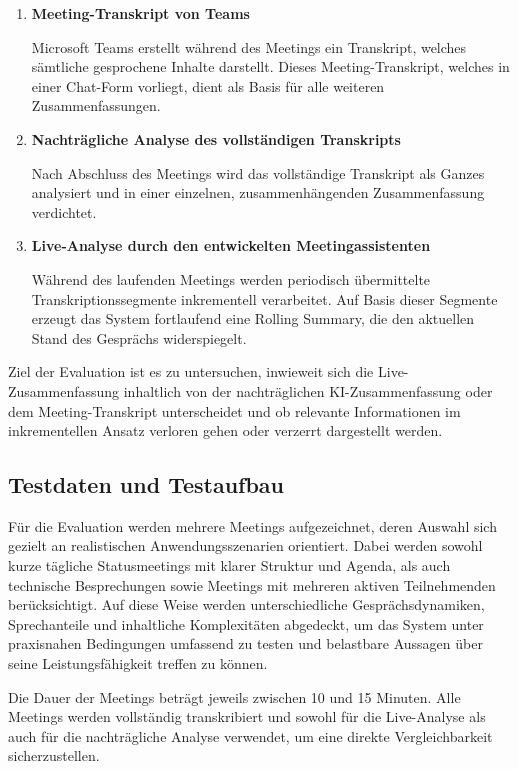 \begin{enumerate}
\item \textbf{Meeting-Transkript von Teams} 

Microsoft Teams erstellt während des Meetings ein Transkript, welches sämtliche gesprochene Inhalte darstellt. Dieses Meeting-Transkript, welches in einer Chat-Form vorliegt, dient als Basis für alle weiteren Zusammenfassungen. 

\item \textbf{Nachträgliche Analyse des vollständigen Transkripts}

Nach Abschluss des Meetings wird das vollständige Transkript als Ganzes analysiert und in einer einzelnen, zusammenhängenden Zusammenfassung verdichtet. 

\item \textbf{Live-Analyse durch den entwickelten Meetingassistenten}

Während des laufenden Meetings werden periodisch übermittelte Transkriptionssegmente inkrementell verarbeitet. Auf Basis dieser Segmente erzeugt das System fortlaufend eine Rolling Summary, die den aktuellen Stand des Gesprächs widerspiegelt. 
\end{enumerate}

 Ziel der Evaluation ist es zu untersuchen, inwieweit sich die Live-Zusammenfassung inhaltlich von der nachträglichen KI-Zusammenfassung oder dem Meeting-Transkript unterscheidet und ob relevante Informationen im inkrementellen Ansatz verloren gehen oder verzerrt dargestellt werden. 

\subsection{Testdaten und Testaufbau}
Für die Evaluation werden mehrere Meetings aufgezeichnet, deren Auswahl sich gezielt an realistischen Anwendungsszenarien orientiert. Dabei werden sowohl kurze tägliche Statusmeetings mit klarer Struktur und Agenda, als auch technische Besprechungen sowie Meetings mit mehreren aktiven Teilnehmenden berücksichtigt. Auf diese Weise werden unterschiedliche Gesprächsdynamiken, Sprechanteile und inhaltliche Komplexitäten abgedeckt, um das System unter praxisnahen Bedingungen umfassend zu testen und belastbare Aussagen über seine Leistungsfähigkeit treffen zu können.

Die Dauer der Meetings beträgt jeweils zwischen 10 und 15 Minuten. Alle Meetings werden vollständig transkribiert und sowohl für die Live-Analyse als auch für die nachträgliche Analyse verwendet, um eine direkte Vergleichbarkeit sicherzustellen. 

